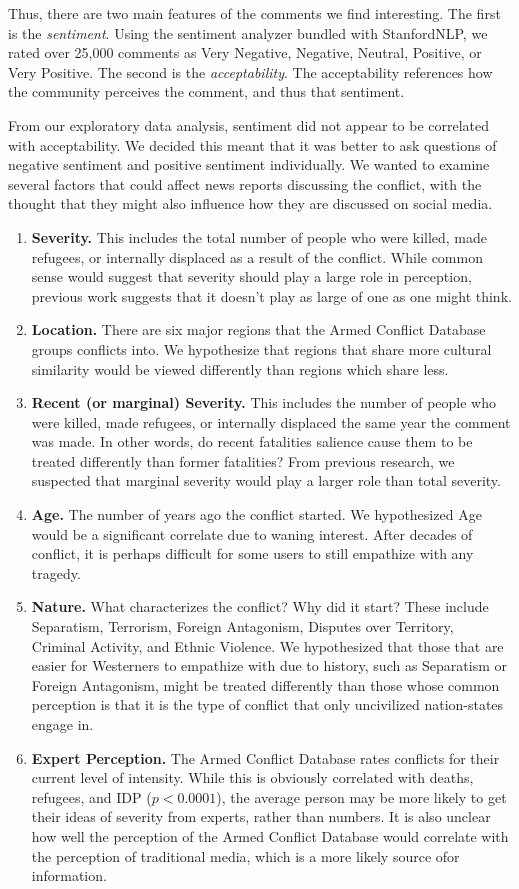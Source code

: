 Thus, there are two main features of the comments we find interesting. The first is the \textit{sentiment}. Using the sentiment analyzer bundled with StanfordNLP\cite{stanfordnlp}, we rated over 25,000 comments as Very Negative, Negative, Neutral, Positive, or Very Positive. The second is the \textit{acceptability}. The acceptability references how the community perceives the comment, and thus that sentiment. 

From our exploratory data analysis, sentiment did not appear to be correlated with acceptability. We decided this meant that it was better to ask questions of negative sentiment and positive sentiment individually. We wanted to examine several factors that could affect news reports discussing the conflict, with the thought that they might also influence how they are discussed on social media.

\begin{enumerate}
\item{\textbf{Severity.} This includes the total number of people who were killed, made refugees, or internally displaced as a result of the conflict. While common sense would suggest that severity should play a large role in perception, previous work suggests that it doesn't play as large of one as one might think.} 
\item {\textbf{Location.} There are six major regions that the Armed Conflict Database groups conflicts into. We hypothesize that regions that share more cultural similarity would be viewed differently than regions which share less.} 
\item {\textbf{Recent (or marginal) Severity.} This includes the number of people who were killed, made refugees, or internally displaced the same year the comment was made. In other words, do recent fatalities salience cause them to be treated differently than former fatalities? From previous research, we suspected that marginal severity would play a larger role than total severity.}
\item {\textbf{Age.} The number of years ago the conflict started. We hypothesized Age would be a significant correlate due to waning interest. After decades of conflict, it is perhaps difficult for some users to still empathize with any tragedy.}
\item {\textbf{Nature.} What characterizes the conflict? Why did it start? These include Separatism, Terrorism, Foreign Antagonism, Disputes over Territory, Criminal Activity, and Ethnic Violence. We hypothesized that those that are easier for Westerners to empathize with due to history, such as Separatism or Foreign Antagonism, might be treated differently than those whose common perception is that it is the type of conflict that only uncivilized nation-states engage in.}
\item {\textbf{Expert Perception.} The Armed Conflict Database rates conflicts for their current level of intensity. While this is obviously correlated with deaths, refugees, and IDP ($p < 0.0001$), the average person may be more likely to get their ideas of severity from experts, rather than numbers. It is also unclear how well the perception of the Armed Conflict Database would correlate with the perception of traditional media, which is a more likely source ofor information.} 
\end{enumerate}